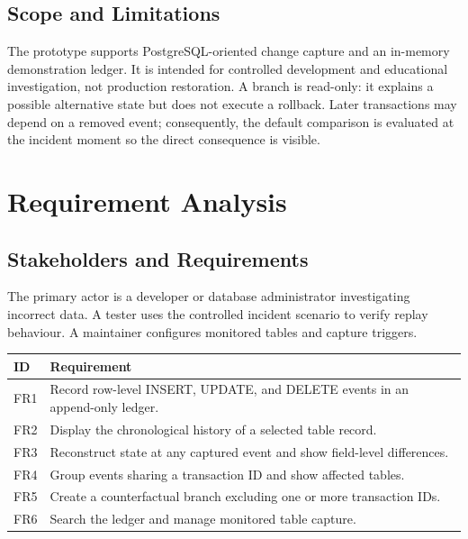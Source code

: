 \documentclass{tietreport}
\begin{document}
\section{Scope and Limitations}
The prototype supports PostgreSQL-oriented change capture and an in-memory demonstration ledger. It is intended for controlled development and educational investigation, not production restoration. A branch is read-only: it explains a possible alternative state but does not execute a rollback. Later transactions may depend on a removed event; consequently, the default comparison is evaluated at the incident moment so the direct consequence is visible.

\chapter{Requirement Analysis}
\section{Stakeholders and Requirements}
The primary actor is a developer or database administrator investigating incorrect data. A tester uses the controlled incident scenario to verify replay behaviour. A maintainer configures monitored tables and capture triggers.

\begin{center}
\begin{tabular}{p{}p{}}
\toprule
ID & Requirement \\
\midrule
FR1 & Record row-level INSERT, UPDATE, and DELETE events in an append-only ledger. \\
FR2 & Display the chronological history of a selected table record. \\
FR3 & Reconstruct state at any captured event and show field-level differences. \\
FR4 & Group events sharing a transaction ID and show affected tables. \\
FR5 & Create a counterfactual branch excluding one or more transaction IDs. \\
FR6 & Search the ledger and manage monitored table capture. \\
\bottomrule
\end{tabular}
\end{center}
\end{document}
